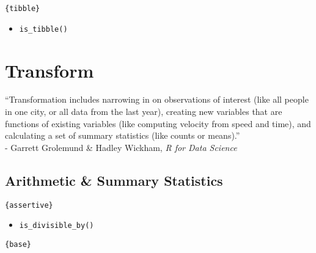 \documentclass[
]{book}
\providecommand{\tightlist}{%
  \setlength{\itemsep}{0pt}\setlength{\parskip}{0pt}}
\begin{document}
\texttt{\{tibble\}}

\begin{itemize}
\tightlist
\item
  \texttt{is\_tibble()}
\end{itemize}

\hypertarget{transform}{%
\chapter{Transform}\label{transform}}

``Transformation includes narrowing in on observations of interest (like all people in one city, or all data from the last year), creating new variables that are functions of existing variables (like computing velocity from speed and time), and calculating a set of summary statistics (like counts or means).''\\
- Garrett Grolemund \& Hadley Wickham, \emph{R for Data Science}

\hypertarget{arithmetic-summary-statistics}{%
\section{Arithmetic \& Summary Statistics}\label{arithmetic-summary-statistics}}

\texttt{\{assertive\}}

\begin{itemize}
\tightlist
\item
  \texttt{is\_divisible\_by()}
\end{itemize}

\texttt{\{base\}}
\end{document}
